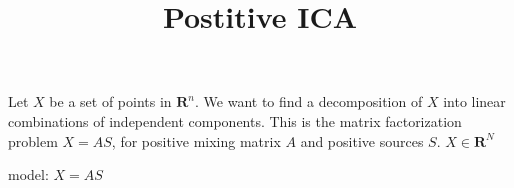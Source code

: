 \documentclass{article}
\title{Postitive ICA}
\begin{document}
Let $X$ be a set of points in $\mathbf{R}^n$. We want to find a decomposition of $X$ into linear combinations of independent components. This is the matrix factorization problem $X = A S$, for positive mixing matrix $A$ and positive sources $S$. 
$X \in \mathbf{R}^N$

model: $X = A S$
\end{document}
